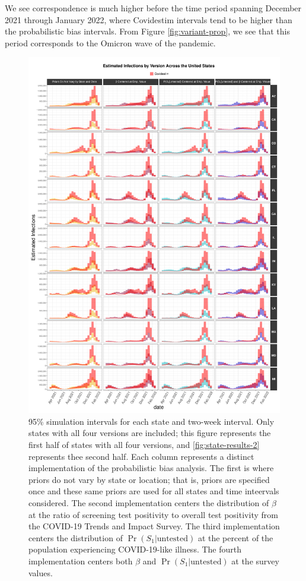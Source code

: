 \documentclass[12pt,twoside]{smiththesis}
\begin{document}
We see correspondence is much higher before the time period spanning December 2021 through January 2022, where Covidestim intervals tend to be higher than the probabilistic bias intervals. From Figure \ref{fig:variant-prop}, we see that this period corresponds to the Omicron wave of the pandemic.
\begin{figure}
\includegraphics[width=1\linewidth]{figure/state_comp_covidestim1} \caption{\label{fig:state-results-1}95\% simulation intervals for each state and two-week interval. Only states with all four versions are included; this figure represents the first half of states with all four versions, and \ref{fig:state-results-2} represents thee second half. Each column represents a distinct implementation of the probabilistic bias analysis. The first is where priors do not vary by state or location; that is, priors are specified once and these same priors are used for all states and time inteervals considered. The second implementation centers the distribution of $\beta$ at the ratio of screening test positivity to overall test positivity from the COVID-19 Trends and Impact Survey. The third implementation centers the distribution of $\Pr(S_1|\text{untested})$ at the percent of the population experiencing COVID-19-like illness. The fourth implementation centers both $\beta$ and $\Pr(S_1|\text{untested})$ at the survey values.}\label{fig:unnamed-chunk-64}
\end{figure}
\end{document}
